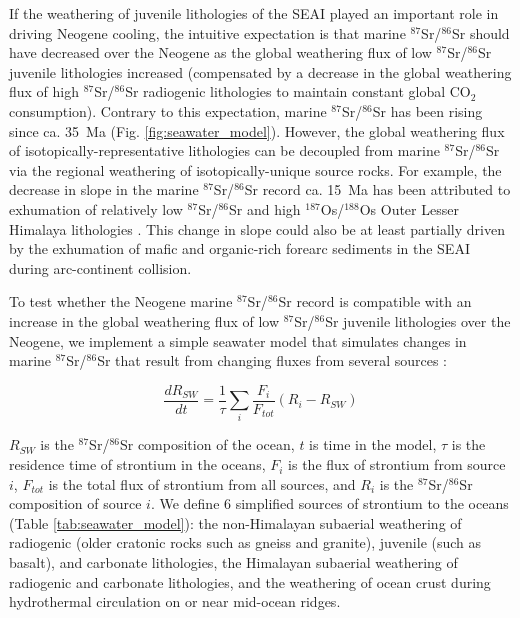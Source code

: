 \documentclass[11pt,letterpaper]{article}
\newcommand{\SrSr}{$^{87}$Sr/$^{86}$Sr\xspace}
\newcommand{\OsOs}{$^{187}$Os/$^{188}$Os\xspace}
\newcommand{\COtwo}{CO$_{2}$\xspace}
\begin{document}
If the weathering of juvenile lithologies of the SEAI played an important role in driving Neogene cooling, the intuitive expectation is that marine \SrSr should have decreased over the Neogene as the global weathering flux of low \SrSr juvenile lithologies increased (compensated by a decrease in the global weathering flux of high \SrSr radiogenic lithologies to maintain constant global \COtwo consumption). Contrary to this expectation, marine \SrSr has been rising since ca. 35~Ma (Fig. \ref{fig:seawater_model}). However, the global weathering flux of isotopically-representative lithologies can be decoupled from marine \SrSr via the regional weathering of isotopically-unique source rocks. For example, the decrease in slope in the marine \SrSr record ca. 15~Ma has been attributed to exhumation of relatively low \SrSr and high \OsOs Outer Lesser Himalaya lithologies \citep{Myrow2015a, Colleps2018a}. This change in slope could also be at least partially driven by the exhumation of mafic and organic-rich forearc sediments in the SEAI during arc-continent collision.

To test whether the Neogene marine \SrSr record is compatible with an increase in the global weathering flux of low \SrSr juvenile lithologies over the Neogene, we implement a simple seawater model that simulates changes in marine \SrSr that result from changing fluxes from several sources \citep{Brass1975a}:

\begin{equation*}
    \frac{dR_{SW}}{dt} = \frac{1}{\tau} \sum_{i} \frac{F_{i}}{F_{tot}}(R_{i} - R_{SW})
\end{equation*}

$R_{SW}$ is the \SrSr composition of the ocean, $t$ is time in the model, $\tau$ is the residence time of strontium in the oceans, $F_{i}$ is the flux of strontium from source $i$, $F_{tot}$ is the total flux of strontium from all sources, and $R_{i}$ is the \SrSr composition of source $i$. We define 6 simplified sources of strontium to the oceans (Table \ref{tab:seawater_model}): the non-Himalayan subaerial weathering of radiogenic (older cratonic rocks such as gneiss and granite), juvenile (such as basalt), and carbonate lithologies, the Himalayan subaerial weathering of radiogenic and carbonate lithologies, and the weathering of ocean crust during hydrothermal circulation on or near mid-ocean ridges.
\end{document}
